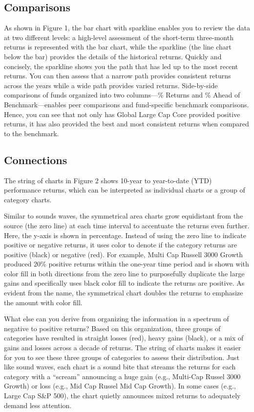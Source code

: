 \documentclass[]{book}
\theoremstyle{definition}
\theoremstyle{definition}
\theoremstyle{definition}
\theoremstyle{remark}
\begin{document}
\subsection{Comparisons}\label{comparisons}

As shown in Figure 1, the bar chart with sparkline enables you to review
the data at two different levels: a high-level assessment of the
short-term three-month returns is represented with the bar chart, while
the sparkline (the line chart below the bar) provides the details of the
historical returns. Quickly and concisely, the sparkline shows you the
path that has led up to the most recent returns. You can then assess
that a narrow path provides consistent returns across the years while a
wide path provides varied returns. Side-by-side comparisons of funds
organized into two columns---\% Returns and \% Ahead of
Benchmark---enables peer comparisons and fund-specific benchmark
comparisons. Hence, you can see that not only has Global Large Cap Core
provided positive returns, it has also provided the best and most
consistent returns when compared to the benchmark.

\subsection{Connections}\label{connections}

The string of charts in Figure 2 shows 10-year to year-to-date (YTD)
performance returns, which can be interpreted as individual charts or a
group of category charts.

Similar to sounds waves, the symmetrical area charts grow equidistant
from the source (the zero line) at each time interval to accentuate the
returns even further. Here, the y-axis is shown in percentage. Instead
of using the zero line to indicate positive or negative returns, it uses
color to denote if the category returns are positive (black) or negative
(red). For example, Multi Cap Russell 3000 Growth produced 20\% positive
returns within the one-year time period and is shown with color fill in
both directions from the zero line to purposefully duplicate the large
gains and specifically uses black color fill to indicate the returns are
positive. As evident from the name, the symmetrical chart doubles the
returns to emphasize the amount with color fill.

What else can you derive from organizing the information in a spectrum
of negative to positive returns? Based on this organization, three
groups of categories have resulted in straight losses (red), heavy gains
(black), or a mix of gains and losses across a decade of returns. The
string of charts makes it easier for you to see these three groups of
categories to assess their distribution. Just like sound waves, each
chart is a sound bite that streams the returns for each category with a
``scream'' announcing a huge gain (e.g., Multi-Cap Russel 3000 Growth)
or loss (e.g., Mid Cap Russel Mid Cap Growth). In some cases (e.g.,
Large Cap S\&P 500), the chart quietly announces mixed returns to
adequately demand less attention.
\end{document}
